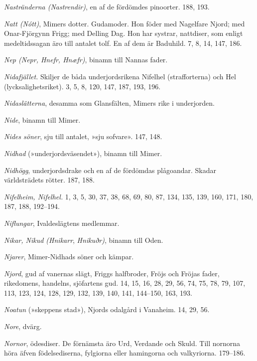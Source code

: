 \emph{Nastränderna (Nastrendir)}, en af de fördömdes pinoorter. 188,
193.

\emph{Natt (Nótt)}, Mimers dotter. Gudamoder. Hon föder med Nagelfare
Njord; med Onar-Fjörgynn Frigg; med Delling Dag. Hon har systrar,
nattdiser, som enligt medeltidssagan äro till antalet tolf. En af dem är
Baduhild. 7, 8, 14, 147, 186.

\emph{Nep (Nepr, Hnefr, Hnæfr)}, binamn till Nannas fader.

\emph{Nidafjället.} Skiljer de båda underjordsrikena Nifelhel
(strafforterna) och Hel (lycksalighetsriket). 3, 5, 8, 120, 147, 187,
193, 196.

\emph{Nidaslätterna}, desamma som Glansfälten, Mimers rike i
underjorden.

\emph{Nide}, binamn till Mimer.

\emph{Nides söner}, sju till antalet, »sju sofvare». 147, 148.

\emph{Nidhad} (»underjordsväsendet»), binamn till Mimer.

\emph{Nidhögg}, underjordsdrake och en af de fördömdas plågoandar.
Skadar världsträdets rötter. 187, 188.

\emph{Nifelheim, Nifelhel.} 1, 3, 5, 30, 37, 38, 68, 69, 80, 87, 134,
135, 139, 160, 171, 180, 187, 188, 192--194.

\emph{Niflungar}, Ivaldeslägtens medlemmar.

\emph{Nikar, Nikud (Hnikarr}, \emph{Hnikuðr)}, binamn till Oden.

\emph{Njarer}, Mimer-Nidhads söner och kämpar.

\emph{Njord}, gud af vanernas slägt, Friggs halfbroder, Fröjs och Fröjas
fader, rikedomens, handelns, sjöfartens gud. 14, 15, 16, 28, 29, 56, 74,
75, 78, 79, 107, 113, 123, 124, 128, 129, 132, 139, 140, 141, 144--150,
163, 193.

\emph{Noatun} (»skeppens stad»), Njords odalgård i Vanaheim. 14, 29, 56.

\emph{Nore}, dvärg.

\emph{Nornor}, ödesdiser. De förnämsta äro Urd, Verdande och Skuld. Till
nornorna höra äfven födelsediserna, fylgiorna eller hamingorna och
valkyriorna. 179--186.

\protect\hypertarget{lb1625905.xhtmlux5cux23start234}{}{}\protect\hypertarget{lb1625905.xhtmlux5cux23start234-a}{}{}\protect\hypertarget{lb1625905.xhtmlux5cux23start234-b}{}{}\protect\hypertarget{lb1625905.xhtmlux5cux23start234-c}{}{}\protect\hypertarget{lb1625905.xhtmlux5cux23start234-d}{}{}

